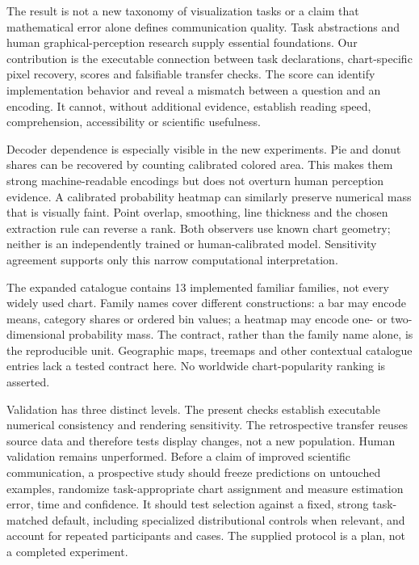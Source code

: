 \documentclass[11pt]{article}
\begin{document}
The result is not a new taxonomy of visualization tasks or a claim that mathematical error alone defines communication quality. Task abstractions and human graphical-perception research supply essential foundations.\cite{brehmer2013,cleveland1984,heer2010} Our contribution is the executable connection between task declarations, chart-specific pixel recovery, scores and falsifiable transfer checks. The score can identify implementation behavior and reveal a mismatch between a question and an encoding. It cannot, without additional evidence, establish reading speed, comprehension, accessibility or scientific usefulness.

Decoder dependence is especially visible in the new experiments. Pie and donut shares can be recovered by counting calibrated colored area. This makes them strong machine-readable encodings but does not overturn human perception evidence. A calibrated probability heatmap can similarly preserve numerical mass that is visually faint.\cite{crameri2020} Point overlap, smoothing, line thickness and the chosen extraction rule can reverse a rank. Both observers use known chart geometry; neither is an independently trained or human-calibrated model. Sensitivity agreement supports only this narrow computational interpretation.

The expanded catalogue contains 13 implemented familiar families, not every widely used chart. Family names cover different constructions: a bar may encode means, category shares or ordered bin values; a heatmap may encode one- or two-dimensional probability mass. The contract, rather than the family name alone, is the reproducible unit. Geographic maps, treemaps and other contextual catalogue entries lack a tested contract here. No worldwide chart-popularity ranking is asserted.

Validation has three distinct levels. The present checks establish executable numerical consistency and rendering sensitivity. The retrospective transfer reuses source data and therefore tests display changes, not a new population. Human validation remains unperformed. Before a claim of improved scientific communication, a prospective study should freeze predictions on untouched examples, randomize task-appropriate chart assignment and measure estimation error, time and confidence. It should test selection against a fixed, strong task-matched default, including specialized distributional controls when relevant, and account for repeated participants and cases. The supplied protocol is a plan, not a completed experiment.
\end{document}
